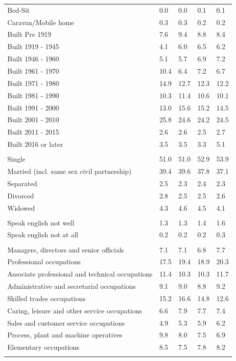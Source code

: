 \documentclass{article}
\begin{document}
\begin{table}[h]
\begin{tabular}{KTTTT}
Bed-Sit & 0.0& 0.0& 0.1& 0.1\\
Caravan/Mobile home & 0.3& 0.3& 0.2& 0.2\\
    \hline
Built Pre 1919 & 7.6& 9.4& 8.8& 8.4\\
Built 1919 - 1945 & 4.1& 6.0& 6.5& 6.2\\
Built  1946 - 1960 & 5.1& 5.7& 6.9& 7.2\\
Built  1961 - 1970 & 10.4&  6.4&  7.2&  6.7\\
Built  1971 - 1980 & 14.9& 12.7& 12.3& 12.2\\
Built  1981 - 1990 & 10.3& 11.4& 10.6& 10.1\\
Built  1991 - 2000 & 13.0& 15.6& 15.2& 14.5\\
Built  2001 - 2010 & 25.8& 24.6& 24.2& 24.5\\
Built  2011 - 2015 & 2.6& 2.6& 2.5& 2.7\\
Built  2016 or later & 3.5& 3.5& 3.3& 5.1\\
\hline
    \\
    \hline
Single & 51.0& 51.0& 52.9& 53.9\\
Married (incl. same sex civil partnership) & 39.4& 39.6& 37.8& 37.1\\
Separated  & 2.5& 2.3& 2.4& 2.3\\
Divorced  & 2.8& 2.5& 2.5& 2.6\\
Widowed & 4.3& 4.6& 4.5& 4.1\\
\hline
    \\ 
    \hline
Speak english not well & 1.3& 1.3& 1.4& 1.6\\
Speak english not at all & 0.2& 0.2& 0.2& 0.3\\
\hline
    \\
    \hline
Managers, directors and senior officials & 7.1& 7.1& 6.8& 7.7\\
Professional occupations & 17.5& 19.4& 18.9& 20.3\\
Associate professional and technical occupations & 11.4& 10.3& 10.3& 11.7\\
Administrative and secretarial occupations & 9.1& 9.0& 8.8& 9.2\\
Skilled trades occupations & 15.2& 16.6& 14.8& 12.6\\
Caring, leisure and other service occupations & 6.6& 7.9& 7.7& 7.4\\
Sales and customer service occupations & 4.9& 5.3& 5.9& 6.2\\
Process, plant and machine operatives & 9.8& 8.0& 7.5& 6.9\\
Elementary occupations & 8.5& 7.5& 7.8& 8.2\\
\hline
\end{tabular}
\end{table}
\end{document}
